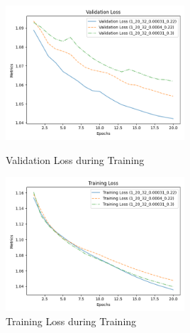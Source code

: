 \documentclass{article}
\begin{document}
\begin{figure}[H]
    \centering
    \begin{minipage}[b]{0.45\textwidth}
        \centering
        \includegraphics[width=\textwidth, height=5cm]{imgs/Validation_loss3.png}
        \caption{Validation Loss during Training}
        \label{fig:ValidationLoss}
    \end{minipage}
    \hfill
    \begin{minipage}[b]{0.45\textwidth}
        \centering
        \includegraphics[width=\textwidth, height=5cm]{imgs/Training_loss3.png}
        \caption{Training Loss during Training}
        \label{fig:TrainingLoss}
    \end{minipage}
\end{figure}
\end{document}
